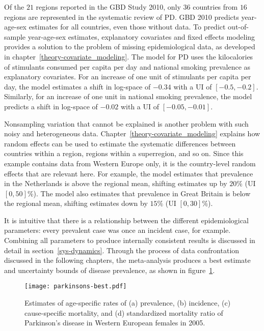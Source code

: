 Of the $21$ regions reported in the GBD Study 2010, only $36$ countries
from $16$ regions are represented in the systematic review of PD.  GBD
2010 predicts year-age-sex estimates for all countries, even
those without data.  To predict out-of-sample year-age-sex estimates,
explanatory covariates and fixed effects modeling provides
a solution to the problem of missing epidemiological data,
as developed in chapter~\ref{theory-covariate_modeling}.  The model for PD uses the
kilocalories of stimulants consumed per capita per day and national smoking prevalence
as explanatory covariates.  For an increase of one unit of stimulants per
capita per day, the model estimates a shift in log-space of $-0.34$
with a UI of $[-0.5, -0.2]$.  Similarly, for an increase of one unit in national
smoking prevalence, the model predicts a shift in log-space of $-0.02$ with a UI
of $[-0.05, -0.01]$.

Nonsampling variation that cannot be explained is another problem with
such noisy and heterogeneous data.  Chapter~\ref{theory-covariate_modeling}
explains how random effects can be used
to estimate the systematic differences between countries within a
region, regions within a superregion, and so on.  Since this example
contains data from Western Europe only, it is the country-level random
effects that are relevant here.  For example, the model estimates that
prevalence in the Netherlands is above the regional mean, shifting
estimates up by $20\%$ (UI $[0, 50]$\%).  The model also estimates
that prevalence in Great Britain is below the regional mean, shifting estimates
down by $15\%$ (UI $[0, 30]\%$).

It is intuitive that there is a relationship between the
different epidemiological parameters: every prevalent case was once an incident
case, for example.  Combining all parameters to produce internally
consistent results is discussed in detail in section~\ref{sys-dynamics}.
Through the process of data confrontation
discussed in the following chapters, the meta-analysis produces a best
estimate and uncertainty bounds of disease prevalence, as shown in
figure~\ref{fig:intro-parkinsons fit}.

    \begin{figure}[h]
        \begin{center}
            \texttt{[image: parkinsons-best.pdf]}
            \caption[Estimates of age-specific rates for Parkinson's disease.]{Estimates
              of age-specific rates of
              (a) prevalence, (b) incidence,
              (c) cause-specific mortality, and
              (d) standardized mortality ratio of Parkinson's
              disease in Western European females in 2005.}
            \label{fig:intro-parkinsons fit}
        \end{center}
    \end{figure}
